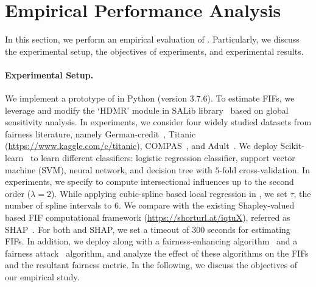 \section{Empirical Performance Analysis}\label{fairness_fairXplainer_sec:experiments}
In this section, we perform an empirical evaluation of {\fairXplainer}. Particularly, we discuss the experimental setup, the objectives of experiments, and experimental results. 

\paragraph{Experimental Setup.} We implement a prototype of {\fairXplainer} in Python (version $ 3.7.6 $). To estimate FIFs, we leverage and modify the `HDMR' module in SALib library~\cite{Herman2017} based on global sensitivity analysis. In experiments, we consider four widely studied datasets from fairness literature, namely German-credit~\cite{DK2017},
Titanic (\url{https://www.kaggle.com/c/titanic}), COMPAS~\cite{angwin2016machine}, and Adult~\cite{DK2017uci}. We deploy Scikit-learn~\cite{scikit-learn} to learn different classifiers: logistic regression classifier, support vector machine (SVM), neural network, and decision tree with $ 5 $-fold cross-validation. In experiments, we specify {\fairXplainer} to compute intersectional influences up to the second order ($ \lambda = 2 $). While applying cubic-spline based local regression in {\fairXplainer}, we set $ \tau $, the number of spline intervals to $ 6 $. We compare {\fairXplainer} with the existing Shapley-valued based FIF computational framework (\url{https://shorturl.at/iqtuX}), referred as SHAP~\cite{lundberg2020explaining}. For both {\fairXplainer} and SHAP, we set a timeout of $ 300 $ seconds for estimating FIFs. In addition, we deploy {\fairXplainer} along with a fairness-enhancing algorithm~\cite{kamiran2012data} and a fairness attack~\cite{solans2020poisoning} algorithm, and analyze the effect of these algorithms on the FIFs and the resultant fairness metric. In the following, we discuss the objectives of our empirical study. 


